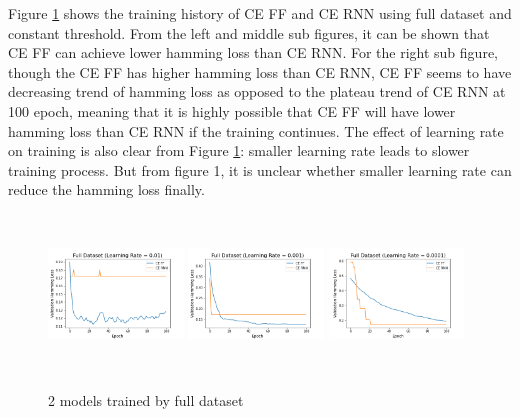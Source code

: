 \documentclass[11pt]{article}
\begin{document}
Figure \ref{fig:example1} shows the training history of CE FF and CE RNN using full dataset and constant threshold. From the left and middle sub figures, it can be shown that CE FF can achieve lower hamming loss than CE RNN. For the right sub figure, though the CE FF has higher hamming loss than CE RNN, CE FF seems to have decreasing trend of hamming loss as opposed to the plateau trend of CE RNN at 100 epoch, meaning that it is highly possible that CE FF will have lower hamming loss than CE RNN if the training continues. The effect of learning rate on training is also clear from Figure \ref{fig:example1}: smaller learning rate leads to slower training process. But from figure 1, it is unclear whether  smaller learning rate can reduce the hamming loss finally.

\begin{figure}[!htbp]
\centering 
        \includegraphics[width=0.32\textwidth,height=4.2cm]{Full_Dataset_Learning_Rate_01.png}
        \includegraphics[width=0.32\textwidth,height=4.2cm]{Full_Dataset_Learning_Rate_001.png}
        \includegraphics[width=0.32\textwidth,height=4.2cm]{Full_Dataset_Learning_Rate_0001.png}        
\caption[Original image and post processed image]{2 models trained by full dataset}
\label{fig:example1} 
\end{figure}
\end{document}
